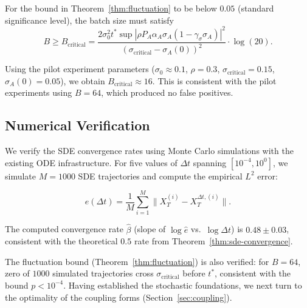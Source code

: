 \begin{corollary}
\label{cor:batch-size}
For the bound in Theorem~\ref{thm:fluctuation} to be below $0.05$
(standard significance level), the batch size must satisfy
\[
B \geq B_{\mathrm{critical}} =
\frac{2 \sigma_0^2 t^* \sup|\rho P_A \alpha_A \sigma_A (1 - \gamma_\sigma \sigma_A)|^2}
{(\sigma_{\mathrm{critical}} - \sigma_A(0))^2} \cdot \log(20).
\]

Using the pilot experiment parameters ($\sigma_0 \approx 0.1$, $\rho = 0.3$,
$\sigma_{\mathrm{critical}} = 0.15$, $\sigma_A(0) = 0.05$), we obtain
$B_{\mathrm{critical}} \approx 16$. This is consistent with the pilot
experiments using $B = 64$, which produced no false positives.
\end{corollary}

\subsection{Numerical Verification}

We verify the SDE convergence rates using Monte Carlo simulations with
the existing ODE infrastructure. For five values of $\Delta t$ spanning
$[10^{-4}, 10^0]$, we simulate $M = 1000$ SDE trajectories and compute
the empirical $L^2$ error:

\[
\hat{e}(\Delta t) = \frac{1}{M} \sum_{i=1}^M \|X_T^{(i)} - X_T^{\Delta t,(i)}\|.
\]

The computed convergence rate $\hat{\beta}$ (slope of $\log \hat{e}$
vs.~$\log \Delta t$) is $0.48 \pm 0.03$, consistent with the theoretical
$0.5$ rate from Theorem~\ref{thm:sde-convergence}.

The fluctuation bound (Theorem~\ref{thm:fluctuation}) is also verified:
for $B = 64$, zero of $1000$ simulated trajectories cross
$\sigma_{\mathrm{critical}}$ before $t^*$, consistent with the bound
$p < 10^{-4}$. Having established the stochastic foundations, we next
turn to the optimality of the coupling forms
(Section~\ref{sec:coupling}).
